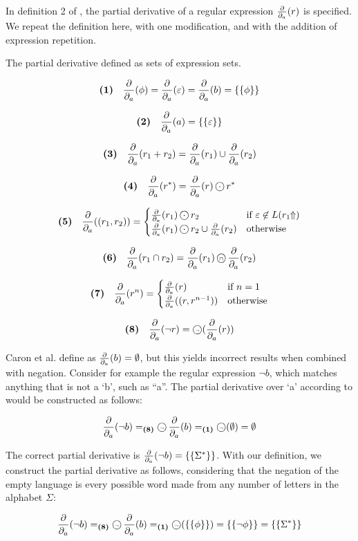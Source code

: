 In definition 2 of \cite{pdere}, the partial derivative of a regular expression
$\frac{\partial}{\partial_{a}}(r)$ is specified. We repeat the definition here, with one modification,
and with the addition of expression repetition.

\begin{defn}
   \label{defn-pd-eset}
   The partial derivative defined as sets of expression sets.

   \[\textbf{(1)}\quad \frac{\partial}{\partial_{a}}(\phi) = \frac{\partial}{\partial_{a}}(\varepsilon) = \frac{\partial}{\partial_{a}}(b) = \{\{ \phi \}\}\]

   \[\textbf{(2)}\quad \frac{\partial}{\partial_{a}}(a) = \{\{ \varepsilon \}\}\]

   \[\textbf{(3)}\quad \frac{\partial}{\partial_{a}}(r_1 + r_2) = \frac{\partial}{\partial_{a}}(r_1) \cup \frac{\partial}{\partial_{a}}(r_2)\]

   \[\nrdef{4} \dda(r^*) = \dda(r) \circledcdot r^*\]

   \[\nrdef{5} \dda((r_1, r_2)) =
       \begin{cases}
          \dda(r_1) \circledcdot r_2 & \text{if } \varepsilon \not\in L(r_1\esetsOfRe) \\
          \dda(r_1) \circledcdot r_2 \cup \dda(r_2) & \text{otherwise}
       \end{cases}
   \]

   \[\textbf{(6)}\quad \frac{\partial}{\partial_{a}}(r_1 \cap r_2) = \frac{\partial}{\partial_{a}}(r_1) \operatorname{\text{\textcircled{\tiny$\cap$}}} \frac{\partial}{\partial_{a}}(r_2)\]

   \[\textbf{(7)}\quad \frac{\partial}{\partial_{a}}(r^n) =
       \begin{cases}
          \frac{\partial}{\partial_{a}}(r) & \text{if } n = 1 \\
          \frac{\partial}{\partial_{a}}((r, r^{n-1})) & \text{otherwise}
       \end{cases}
   \]

   \[\textbf{(8)}\quad \frac{\partial}{\partial_{a}}(\neg r) = \operatorname{\text{\textcircled{\tiny$\neg$}}} (\frac{\partial}{\partial_{a}}(r))\]

\end{defn}

Caron et al. define  as $\frac{\partial}{\partial_{a}}(b) = \emptyset$, but this yields incorrect
results when combined with negation. Consider for example the regular expression
$\neg b$, which matches anything that is not a `b', such as ``a''.  The partial
derivative over `a' according to \cite{pdere} would be constructed as follows:

\[\frac{\partial}{\partial_{a}}(\neg b)
   =_{\textbf{(8)}} \operatorname{\text{\textcircled{\tiny$\neg$}}} \frac{\partial}{\partial_{a}}(b)
   =_{\textbf{(1)}} \operatorname{\text{\textcircled{\tiny$\neg$}}} (\emptyset)
   = \emptyset
\]

The correct partial derivative is $\frac{\partial}{\partial_{a}}(\neg b) = \{\{\Sigma^*\}\}$. With our
definition, we construct the partial derivative as follows, considering that the
negation of the empty language is every possible word made from any number of
letters in the alphabet $\Sigma$:

\[\frac{\partial}{\partial_{a}}(\neg b)
   =_{\textbf{(8)}} \operatorname{\text{\textcircled{\tiny$\neg$}}} \frac{\partial}{\partial_{a}}(b)
   =_{\textbf{(1)}} \operatorname{\text{\textcircled{\tiny$\neg$}}} (\{\{\phi\}\})
   = \{\{\neg\phi\}\}
   = \{\{\Sigma^*\}\}
\]



